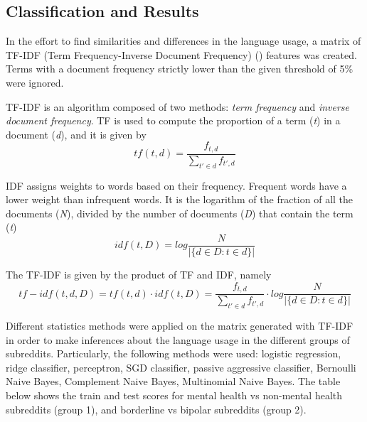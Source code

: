 \documentclass{article}
\begin{document}
\subsection{Classification and Results}

In the effort to find similarities and differences in the language usage, a matrix of TF-IDF (Term Frequency-Inverse Document Frequency) (\cite{salton1988term}) features was created. Terms with a document frequency strictly lower than the given threshold of 5\% were ignored.  

TF-IDF is an algorithm composed of two methods: \emph{term frequency} and \emph{inverse document frequency}. TF is used to compute the proportion of a term (\emph{t}) in a document (\emph{d}), and it is given by
\[tf(t, d) = \dfrac{f_{t, d}}{\sum\limits_{t' \in d} f_{t', d}}\]

IDF assigns weights to words based on their frequency. Frequent words have a lower weight than infrequent words. It is the logarithm of the fraction of all the documents (\emph{N}), divided by the number of documents (\emph{D}) that contain the term (\emph{t})
\[idf(t, D) = log \dfrac{N}{|\{d \in D: t\in d\}|}\]

The TF-IDF is given by the product of TF and IDF, namely
\[tf-idf(t, d, D) = tf(t,d) \cdot idf(t, D) = \dfrac{f_{t, d}}{\sum\limits_{t' \in d} f_{t', d}} \cdot log \dfrac{N}{|\{d \in D: t\in d\}|}\]



Different statistics methods were applied on the matrix generated with TF-IDF in order to make inferences about the language usage in the different groups of subreddits. Particularly, the following methods were used: logistic regression, ridge classifier, perceptron, SGD classifier, passive aggressive classifier, Bernoulli Naive Bayes, Complement Naive Bayes, Multinomial Naive Bayes. The table below shows the train and test scores for mental health vs non-mental health subreddits (group 1), and borderline vs bipolar subreddits (group 2).
\end{document}
